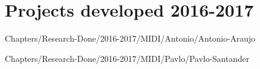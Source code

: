 \part{Projects developed 2016-2017}



{Chapters/Research-Done/2016-2017/MIDI/Antonio/Antonio-Araujo} 

{Chapters/Research-Done/2016-2017/MIDI/Pavlo/Pavlo-Santander} 







